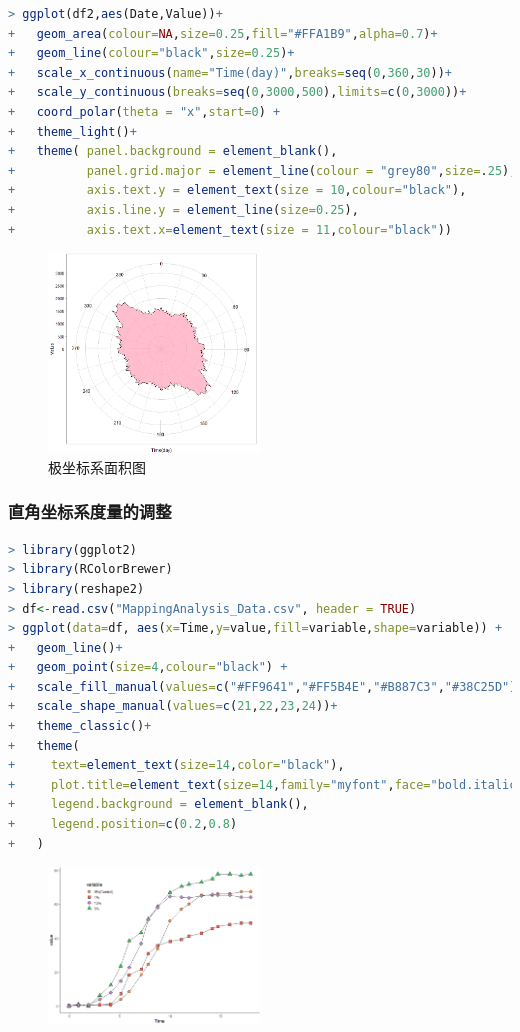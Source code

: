 \documentclass[11pt,a4paper,oneside]{book}
\begin{document}
\begin{lstlisting}[language=r]
> ggplot(df2,aes(Date,Value))+
+   geom_area(colour=NA,size=0.25,fill="#FFA1B9",alpha=0.7)+
+   geom_line(colour="black",size=0.25)+
+   scale_x_continuous(name="Time(day)",breaks=seq(0,360,30))+
+   scale_y_continuous(breaks=seq(0,3000,500),limits=c(0,3000))+
+   coord_polar(theta = "x",start=0) +
+   theme_light()+
+   theme( panel.background = element_blank(),
+          panel.grid.major = element_line(colour = "grey80",size=.25),
+          axis.text.y = element_text(size = 10,colour="black"),
+          axis.line.y = element_line(size=0.25),
+          axis.text.x=element_text(size = 11,colour="black"))
\end{lstlisting}
\begin{figure}[H]
	\centering
	\includegraphics[width=0.5\textwidth]{screenshot003}
	\caption{极坐标系面积图}
	\label{fig:screenshot003}
\end{figure}

\subsubsection{直角坐标系度量的调整}
\begin{lstlisting}[language=r]
> library(ggplot2)
> library(RColorBrewer)
> library(reshape2)
> df<-read.csv("MappingAnalysis_Data.csv", header = TRUE)
> ggplot(data=df, aes(x=Time,y=value,fill=variable,shape=variable)) + 
+   geom_line()+
+   geom_point(size=4,colour="black") +
+   scale_fill_manual(values=c("#FF9641","#FF5B4E","#B887C3","#38C25D"))+
+   scale_shape_manual(values=c(21,22,23,24))+
+   theme_classic()+
+   theme(
+     text=element_text(size=14,color="black"),
+     plot.title=element_text(size=14,family="myfont",face="bold.italic",hjust=.5,color="black"),
+     legend.background = element_blank(),
+     legend.position=c(0.2,0.8)
+   )
\end{lstlisting}
\begin{figure}[H]
	\centering
	\includegraphics[width=0.5\textwidth]{screenshot006}
\end{figure}
\end{document}
